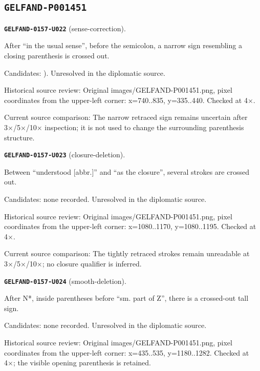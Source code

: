 \subsection*{\texttt{GELFAND-P001451}}
\par\noindent\leavevmode{}\label{GELFAND-0157-U022}\label{GELFAND-P001451:sense-correction}\textbf{\texttt{GELFAND-0157-U022}} (sense-correction).\nopagebreak[4]\par
After “in the usual sense”, before the semicolon, a narrow sign resembling a closing parenthesis is crossed out.\par
Candidates: ). Unresolved in the diplomatic source.\par
Historical source review: Original images/GELFAND-P001451.png, pixel coordinates from the upper-left corner: x=740..835, y=335..440. Checked at 4×.\par
Current source comparison: The narrow retraced sign remains uncertain after 3×/5×/10× inspection; it is not used to change the surrounding parenthesis structure.\par\medskip
\par\noindent\leavevmode{}\label{GELFAND-0157-U023}\label{GELFAND-P001451:closure-deletion}\textbf{\texttt{GELFAND-0157-U023}} (closure-deletion).\nopagebreak[4]\par
Between “understood [abbr.]” and “as the closure”, several strokes are crossed out.\par
Candidates: none recorded. Unresolved in the diplomatic source.\par
Historical source review: Original images/GELFAND-P001451.png, pixel coordinates from the upper-left corner: x=1080..1170, y=1080..1195. Checked at 4×.\par
Current source comparison: The tightly retraced strokes remain unreadable at 3×/5×/10×; no closure qualifier is inferred.\par\medskip
\par\noindent\leavevmode{}\label{GELFAND-0157-U024}\label{GELFAND-P001451:smooth-deletion}\textbf{\texttt{GELFAND-0157-U024}} (smooth-deletion).\nopagebreak[4]\par
After N*, inside parentheses before “sm. part of Z”, there is a crossed-out tall sign.\par
Candidates: none recorded. Unresolved in the diplomatic source.\par
Historical source review: Original images/GELFAND-P001451.png, pixel coordinates from the upper-left corner: x=435..535, y=1180..1282. Checked at 4×; the visible opening parenthesis is retained.\par
